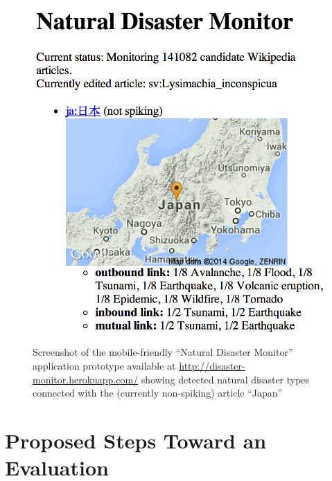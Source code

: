 \documentclass[runningheads,a4paper]{llncs}
\begin{document}
\begin{figure}[hbt]
  \centering
  \includegraphics[width=0.365\linewidth]{natural-disaster-monitor}
  \caption{Screenshot of the mobile-friendly ``Natural Disaster Monitor'' application
    prototype available at \url{http://disaster-monitor.herokuapp.com/}
    showing detected natural disaster types connected with the (currently non-spiking) article ``Japan''}
  \label{fig:screenshot}
\end{figure}
 

\section{Proposed Steps Toward an Evaluation}
\end{document}
